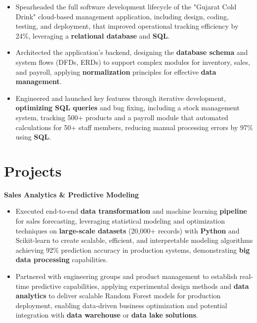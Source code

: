 \documentclass[a4paper,10pt]{article}
\begin{document}
\begin{itemize}[leftmargin=*, itemsep=0pt, parsep=1pt] %
\vspace{-7mm}
    \item Spearheaded the full software development lifecycle of the "Gujarat Cold Drink" cloud-based management application, including design, coding, testing, and deployment, that improved operational tracking efficiency by 24\%, leveraging a \textbf{relational database} and \textbf{SQL}.
\item Architected the application's backend, designing the \textbf{database schema} and system flows (DFDs, ERDs) to support complex modules for inventory, sales, and payroll, applying \textbf{normalization} principles for effective \textbf{data management}.
\item Engineered and launched key features through iterative development, \textbf{optimizing SQL queries} and bug fixing, including a stock management system, tracking 500+ products and a payroll module that automated calculations for 50+ staff members, reducing manual processing errors by 97\% using \textbf{SQL}. 

\end{itemize}

\vspace{-4mm}

\section*{Projects}
\textbf{Sales Analytics \& Predictive Modeling} \\
\begin{itemize}[leftmargin=*, itemsep=0pt, parsep=1pt]
\vspace{-7mm}
    \item Executed end-to-end \textbf{data transformation} and machine learning \textbf{pipeline} for sales forecasting, leveraging statistical modeling and optimization techniques on \textbf{large-scale datasets} (20,000+ records) with \textbf{Python} and Scikit-learn to create scalable, efficient, and interpretable modeling algorithms achieving 92\% prediction accuracy in production systems, demonstrating \textbf{big data processing} capabilities.
    \item Partnered with engineering groups and product management to establish real-time predictive capabilities, applying experimental design methods and \textbf{data analytics} to deliver scalable Random Forest models for production deployment, enabling data-driven business optimization and potential integration with \textbf{data warehouse} or \textbf{data lake solutions}.
    \end{itemize}
\end{document}

